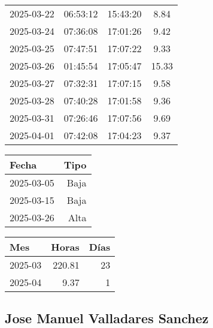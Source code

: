 \documentclass[11pt,a4paper]{article}
\newcommand{\infobox}[2]{
  \begin{tcolorbox}[
    colback=grisclaro,
    colframe=corporativo,
    title=#1,
    fonttitle=\bfseries
  ]
  #2
  \end{tcolorbox}
}
\begin{document}
\begin{minipage}[t]{0.62\textwidth}
{\begin{tabular}{lccc}
2025-03-22 & 06:53:12 & 15:43:20 & 8.84\\

2025-03-24 & 07:36:08 & 17:01:26 & 9.42\\

2025-03-25 & 07:47:51 & 17:07:22 & 9.33\\

2025-03-26 & 01:45:54 & 17:05:47 & 15.33\\

2025-03-27 & 07:32:31 & 17:07:15 & 9.58\\

2025-03-28 & 07:40:28 & 17:01:58 & 9.36\\

2025-03-31 & 07:26:46 & 17:07:56 & 9.69\\

2025-04-01 & 07:42:08 & 17:04:23 & 9.37\\

\bottomrule
\end{tabular}
}
\end{minipage}
\hfill
\begin{minipage}[t]{0.35\textwidth}
\infobox{D\'ias At\'ipicos}{
\begin{tabular}{lr}
\toprule
\rowcolor{grisclaro} \textbf{Fecha} & \textbf{Tipo}\\
\midrule

2025-03-05 & Baja\\

2025-03-15 & Baja\\

2025-03-26 & Alta\\

\bottomrule
\end{tabular}
}

\vspace{1em}
\infobox{Resumen Mensual}{
\begin{tabular}{lrr}
\toprule
\rowcolor{grisclaro} \textbf{Mes} & \textbf{Horas} & \textbf{D\'ias}\\
\midrule

2025-03 & 220.81 & 23\\

2025-04 & 9.37 & 1\\

\bottomrule
\end{tabular}
}
\end{minipage}

\clearpage


\subsection{ Jose Manuel Valladares Sanchez }
\end{document}
